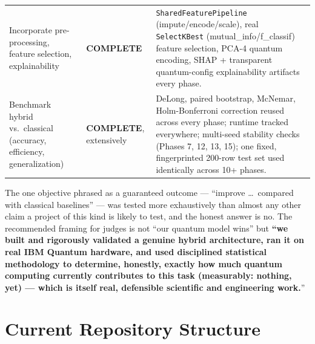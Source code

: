 \documentclass[11pt,a4paper]{article}
\newcommand{\code}[1]{\texttt{\small #1}}
\newcommand{\done}{\textcolor{donecolor}{\textbf{COMPLETE}}}
\begin{document}
\begin{center}
\begin{tabularx}{\textwidth}{@{}p{5.6cm}p{2.0cm}Y@{}}
Incorporate pre-processing, feature selection, explainability & \done & \code{SharedFeaturePipeline} (impute/encode/scale), real \code{SelectKBest} (mutual\_info/f\_classif) feature selection, PCA-4 quantum encoding, SHAP + transparent quantum-config explainability artifacts every phase. \\
Benchmark hybrid vs.\ classical (accuracy, efficiency, generalization) & \done, extensively & DeLong, paired bootstrap, McNemar, Holm-Bonferroni correction reused across every phase; runtime tracked everywhere; multi-seed stability checks (Phases 7, 12, 13, 15); one fixed, fingerprinted 200-row test set used identically across 10+ phases. \\
\bottomrule
\end{tabularx}
\end{center}

The one objective phrased as a guaranteed outcome --- ``improve \dots\ compared with classical baselines'' --- was tested more exhaustively than almost any other claim a project of this kind is likely to test, and the honest answer is no. The recommended framing for judges is not ``our quantum model wins'' but \textbf{``we built and rigorously validated a genuine hybrid architecture, ran it on real IBM Quantum hardware, and used disciplined statistical methodology to determine, honestly, exactly how much quantum computing currently contributes to this task (measurably: nothing, yet) --- which is itself real, defensible scientific and engineering work.}''

\section{Current Repository Structure}
\end{document}
